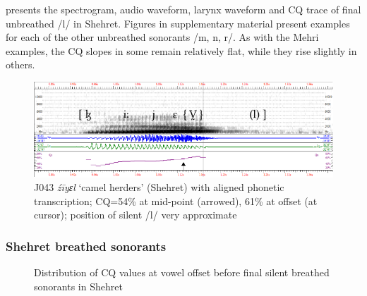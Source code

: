 \documentclass[output=paper]{langscibook}
\begin{document}
 presents the spectrogram, audio waveform, larynx waveform and CQ trace of final unbreathed \mbox{/l/} in Shehret. Figures in supplementary material present examples for each of the other unbreathed sonorants /m, n, r/. As with the Mehri examples, the CQ slopes in some remain relatively flat, while they rise slightly in others.

\begin{figure}[p]
\includegraphics[width=\textwidth]{figures/a12Watsonetal-img025.pdf}
\caption{J043 \textit{źīyɛl} ‘camel herders’ (Shehret) with aligned phonetic transcription; CQ=54\% at mid-point (arrowed), 61\% at offset (at cursor); position of silent \mbox{/l/} very approximate}
\label{fig:watson:21}
\end{figure}

\subsubsection{Shehret breathed sonorants} %
\label{sec:watson:4.4.4}

\begin{figure}[p]
\caption{Distribution of CQ values at vowel offset before final silent breathed sonorants in Shehret}
\label{fig:watson:22}
\end{figure}
\end{document}
